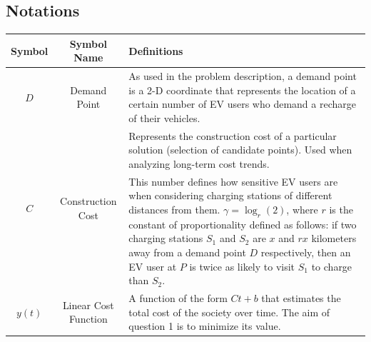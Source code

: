 \documentclass[10pt]{article}
\begin{document}
\subsection{Notations}
{\renewcommand{\arraystretch}{1.9}%
\label{Definitions}
\begin{table}[htbp]
\label{tabular:defini}
    \centering
    \begin{tabularx}{6in}{c|c|X}

        Symbol & Symbol Name & Definitions \\
        \hline
        
        \multirow{2.5}{*}{\centering $D$} &
        \multirow{2.5}{*}{\centering Demand Point} &
        \small{As used in the problem description, a demand point is a 2-D coordinate that represents the location of a certain number of EV users who demand a recharge of their vehicles.} \\
        
        \hline
        
        \multirow{2}{*}{\centering $C$} &
        \multirow{2}{*}{\centering Construction Cost} &
        \small{Represents the construction cost of a particular solution (selection of candidate points). Used when analyzing long-term cost trends.} \\
        
        
        
        \hline
        
        \multirow{6}{*}{\centering $\gamma$} & \multirow{6}{*}{\centering Distance Selection Bias} &
        \small{This number defines how sensitive EV users are when considering charging stations of different distances from them. $\gamma = \log_r(2)$, where $r$ is the constant of proportionality defined as follows: if two charging stations $S_1$ and $S_2$ are $x$ and $rx$ kilometers away from a demand point $D$ respectively, then an EV user at $P$ is twice as likely to visit $S_1$ to charge than $S_2$.} \\
        
        \hline
        
        \multirow{3}{*}{\centering $y(t)$} &
        \multirow{3}{*}{\centering Linear Cost Function} &
        \small{A function of the form $Ct + b$ that estimates the total cost of the society over time. The aim of question 1 is to minimize its value.}\\
        

\end{tabularx}
\end{table}}
\end{document}

